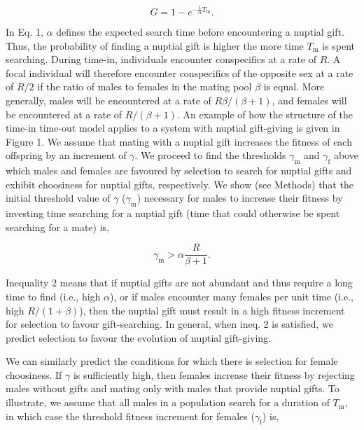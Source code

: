 \documentclass[
]{article}
\begin{document}
\begin{equation}
G = 1 - e^{-\frac{1}{\alpha}T_{\mathrm{m}}}.
\end{equation}

In Eq. 1, \(\alpha\) defines the expected search time before
encountering a nuptial gift. Thus, the probability of finding a nuptial
gift is higher the more time \(T_{\mathrm{m}}\) is spent searching.
During time-in, individuals encounter conspecifics at a rate of \(R\). A
focal individual will therefore encounter conspecifics of the opposite
sex at a rate of \(R/2\) if the ratio of males to females in the mating
pool \(\beta\) is equal. More generally, males will be encountered at a
rate of \(R\beta/(\beta+1)\), and females will be encountered at a rate
of \(R/(\beta+1)\). An example of how the structure of the time-in
time-out model applies to a system with nuptial gift-giving is given in
Figure 1. We assume that mating with a nuptial gift increases the
fitness of each offspring by an increment of \(\gamma\). We proceed to
find the thresholds \(\gamma_{\mathrm{m}}\) and \(\gamma_{\mathrm{f}}\)
above which males and females are favoured by selection to search for
nuptial gifts and exhibit choosiness for nuptial gifts, respectively. We
show (see Methods) that the initial threshold value of \(\gamma\)
(\(\gamma_{\mathrm{m}}\)) necessary for males to increase their fitness
by investing time searching for a nuptial gift (time that could
otherwise be spent searching for a mate) is,

\begin{equation}
\gamma_{\mathrm{m}} > \alpha \frac{R}{\beta + 1}.
\end{equation}

Inequality 2 means that if nuptial gifts are not abundant and thus
require a long time to find (i.e., high \(\alpha\)), or if males
encounter many females per unit time (i.e., high \(R / (1+\beta)\)),
then the nuptial gift must result in a high fitness increment for
selection to favour gift-searching. In general, when ineq. 2 is
satisfied, we predict selection to favour the evolution of nuptial
gift-giving.

We can similarly predict the conditions for which there is selection for
female choosiness. If \(\gamma\) is sufficiently high, then females
increase their fitness by rejecting males without gifts and mating only
with males that provide nuptial gifts. To illustrate, we assume that all
males in a population search for a duration of \(T_{\mathrm{m}}\), in
which case the threshold fitness increment for females
(\(\gamma_{\mathrm{f}}\)) is,
\end{document}

